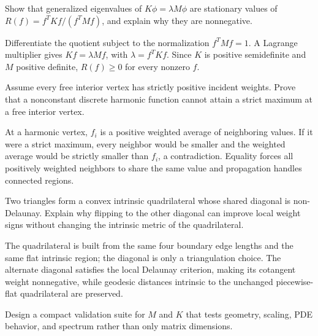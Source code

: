 \begin{problem}\label{prob:vii41-ch02}
Show that generalized eigenvalues of \(K\phi=\lambda M\phi\) are stationary values of \(R(f)=f^TKf/(f^TMf)\), and explain why they are nonnegative.
\end{problem}

\begin{solution}
Differentiate the quotient subject to the normalization \(f^TMf=1\).  A Lagrange multiplier gives \(Kf=\lambda Mf\), with \(\lambda=f^TKf\).  Since \(K\) is positive semidefinite and \(M\) positive definite, \(R(f)\ge0\) for every nonzero \(f\).
\end{solution}

\begin{problem}\label{prob:vii41-ch03}
Assume every free interior vertex has strictly positive incident weights.  Prove that a nonconstant discrete harmonic function cannot attain a strict maximum at a free interior vertex.
\end{problem}

\begin{solution}
At a harmonic vertex, \(f_i\) is a positive weighted average of neighboring values.  If it were a strict maximum, every neighbor would be smaller and the weighted average would be strictly smaller than \(f_i\), a contradiction.  Equality forces all positively weighted neighbors to share the same value and propagation handles connected regions.
\end{solution}

\begin{problem}\label{prob:vii41-ch04}
Two triangles form a convex intrinsic quadrilateral whose shared diagonal is non-Delaunay.  Explain why flipping to the other diagonal can improve local weight signs without changing the intrinsic metric of the quadrilateral.
\end{problem}

\begin{solution}
The quadrilateral is built from the same four boundary edge lengths and the same flat intrinsic region; the diagonal is only a triangulation choice.  The alternate diagonal satisfies the local Delaunay criterion, making its cotangent weight nonnegative, while geodesic distances intrinsic to the unchanged piecewise-flat quadrilateral are preserved.
\end{solution}

\begin{problem}\label{prob:vii41-ch05}
Design a compact validation suite for \(M\) and \(K\) that tests geometry, scaling, PDE behavior, and spectrum rather than only matrix dimensions.
\end{problem}

